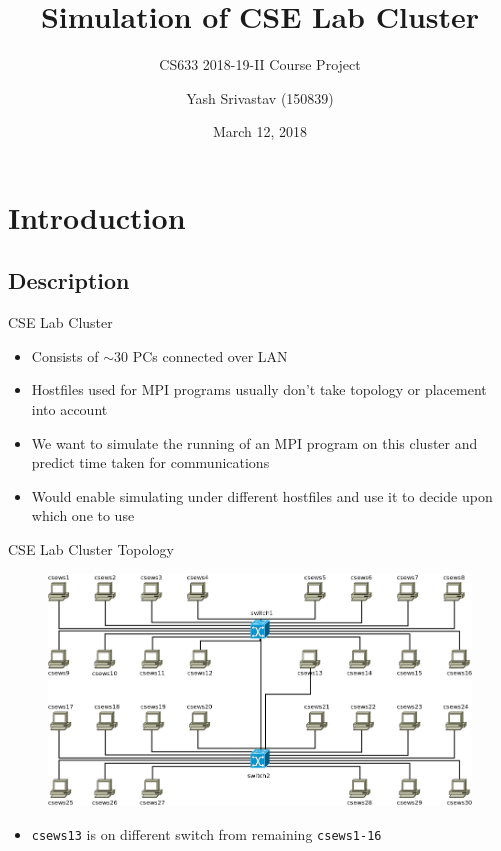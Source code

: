 \documentclass[pdf]{beamer}
\title{Simulation of CSE Lab Cluster}
\subtitle{CS633 2018-19-II Course Project}
\author{Yash Srivastav (150839)}
\date{March 12, 2018}
\begin{document}
\begin{frame}
  \titlepage
\end{frame}
\section{Introduction}
\subsection{Description}
\begin{frame}{CSE Lab Cluster}
  \begin{itemize}
    \item<1-> Consists of $\sim{} 30$ PCs connected over LAN
    \item<2-> Hostfiles used for MPI programs usually don't take topology or
      placement into account
    \item<3-> We want to simulate the running of an MPI program on this cluster
      and predict time taken for communications
    \item<4-> Would enable simulating under different hostfiles and use it to
      decide upon which one to use
  \end{itemize}
\end{frame}
\begin{frame}{CSE Lab Cluster Topology}
  \begin{figure}[ht]
    \begin{center}
      \includegraphics[width=\textwidth]{topology}
    \end{center}
  \end{figure}
  \begin{itemize}
    \item \texttt{csews13} is on different switch from remaining \texttt{csews1-16}
  \end{itemize}
\end{frame}
\end{document}

